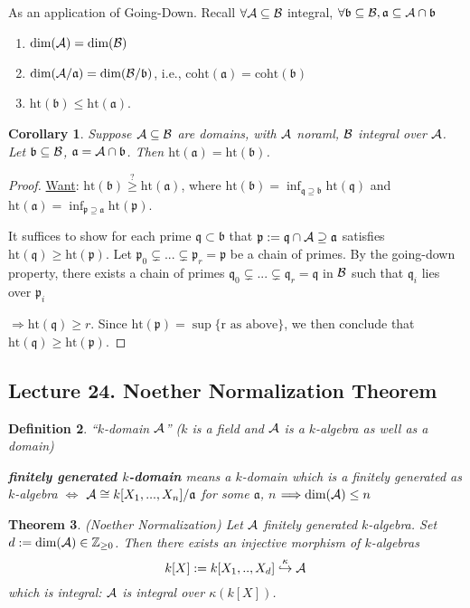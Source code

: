 \documentclass[11pt]{article}
\newtheorem{thm}{Theorem}[section]
\newtheorem{cor}[thm]{Corollary}
\newtheorem{dfn}[thm]{Definition}
\newcommand{\intg}{\mathbb Z}
\newcommand{\sca}{{\mathfrak a}}
\newcommand{\scb}{{\mathfrak b}}
\newcommand{\scp}{{\mathfrak p}}
\newcommand{\scq}{\mathfrak q}
\newcommand{\cala}{{\cal A}}
\newcommand{\calb}{{\cal B}}
\newcommand{\Lrta}{\Longrightarrow}
\newcommand{\Llrta}{\Longleftrightarrow}
\newcommand{\inj}{\hookrightarrow}
\begin{document}
As an application of Going-Down. Recall $\forall \cala\subseteq \calb$ integral, $\forall \scb\subseteq \calb,\sca\subseteq \cala\cap \scb$
\begin{enumerate}[label=(\roman*)]
\item $\text{dim}(\cala)=\text{dim}(\calb)$
\item $\text{dim}(\cala/\sca)=\text{dim}(\calb/\scb)$, i.e., $
\text{coht}(\sca)=\text{coht}(\scb)$
\item $\text{ht}(\scb)\leq \text{ht}(\sca)$.
\end{enumerate}
\begin{cor}
Suppose $\cala\subseteq \calb$ are domains, with $\cala$ noraml, $\calb$ integral over $\cala$. Let $\scb\subseteq \calb$, $\sca=\cala\cap \scb$. Then $\text{ht}(\sca)=\text{ht}(\scb)$.
\end{cor}
\begin{proof}
\underline{Want}: $\text{ht}(\scb)\overset{?}{\geq} \text{ht}(\sca)$, where $\text{ht}(\scb)=\inf_{\scq\supseteq \scb} \text{ht}(\scq)$ and  $\text{ht}(\sca)=\inf_{\scp\supseteq \sca} \text{ht}(\scp)$.

It suffices to show for each prime $\scq\subset\scb$ that $\scp:=\scq\cap \cala\supseteq \sca$ satisfies $\text{ht}(\scq)\geq \text{ht}(\scp)$. Let $\scp_0\subsetneq ...\subsetneq \scp_r=\scp$ be a chain of primes. By the going-down property, there exists a chain of primes $\scq_0\subsetneq ...\subsetneq \scq_r=\scq$ in $\calb$ such that $\scq_i$ lies over $\scp_i$

$\Lrta \text{ht}(\scq)\geq r$. Since $\text{ht}(\scp)=\sup\{\text{r as above}\}$, we then conclude that $\text{ht}(\scq)\geq \text{ht}(\scp)$.
\end{proof}

\subsection{Lecture 24. Noether Normalization Theorem}

\begin{dfn}
``$k$-domain $\cala$'' ($k$ is a field and $\cala$ is a $k$-algebra as well as a domain)

\textbf{finitely generated $k$-domain} means a $k$-domain which is a finitely generated as $k$-algebra
$\Llrta$ $\cala\cong k[X_1,...,X_n]/\sca$ for some $\sca$, $n$ $\Lrta \text{dim}(\cala)\leq n$
\end{dfn}

\begin{thm}\label{thm:Noether_Normalization}(Noether Normalization)
Let $\cala$ finitely generated $k$-algebra. Set $d:=\text{dim}(\cala)\in \intg_{\geq 0}$. Then there exists an injective morphism of $k$-algebras
$$
k[X]:=k[X_1,..,X_d]\overset{\kappa}{\inj} \cala
$$
which is integral: $\cala$ is integral over $\kappa(k[X])$.
\end{thm}
\end{document}
